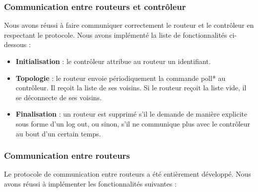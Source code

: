 \subsubsection{Communication entre routeurs et contrôleur}
Nous avons réussi à faire communiquer correctement le routeur et le contrôleur en respectant le protocole. Nous avons implémenté la liste de fonctionnalités ci-dessous : 
\begin{itemize}
\item \textbf{Initialisation} : le contrôleur attribue au routeur un identifiant.
\item \textbf{Topologie} : le routeur envoie périodiquement la commande poll* au contrôleur. Il reçoit la liste de ses voisins. Si le routeur reçoit la liste vide, il se déconnecte de ses voisins.
\item \textbf{Finalisation} : un routeur est supprimé s'il le demande de manière explicite sous forme d'un log out, ou sinon, s'il ne communique plus avec le contrôleur au bout d'un certain temps.

\end{itemize}


\subsubsection{Communication entre routeurs}

Le protocole de communication entre routeurs a été entièrement développé. Nous avons réussi à implémenter les fonctionnalités suivantes : 

